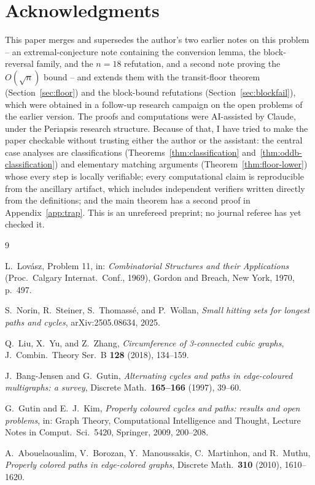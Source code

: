 \documentclass[11pt]{article}
\theoremstyle{definition}
\begin{document}
\section*{Acknowledgments}

This paper merges and supersedes the author's two earlier notes on this problem -- an
extremal-conjecture note containing the conversion lemma, the block-reversal family, and
the $n=18$ refutation, and a second note proving the $O(\sqrt n)$ bound -- and extends
them with the transit-floor theorem (Section~\ref{sec:floor}) and the block-bound
refutations (Section~\ref{sec:blockfail}), which were obtained in a follow-up research
campaign on the open problems of the earlier version. The proofs and computations were
AI-assisted by Claude, under the Periapsis research structure. Because of that, I have
tried to make the paper checkable without trusting either the author or the assistant:
the central case analyses are classifications
(Theorems~\ref{thm:classification} and~\ref{thm:oddb-classification}) and elementary
matching arguments (Theorem~\ref{thm:floor-lower}) whose every step is locally
verifiable; every computational claim is reproducible from the ancillary artifact,
which includes independent verifiers written directly from the definitions; and the
main theorem has a second proof in Appendix~\ref{app:trap}. This is an unrefereed
preprint; no journal referee has yet checked it.

\begin{thebibliography}{9}

L.~Lov\'asz,
Problem 11, in:
\emph{Combinatorial Structures and their Applications}
(Proc.\ Calgary Internat.\ Conf., 1969),
Gordon and Breach, New York, 1970, p.~497.

S.~Norin, R.~Steiner, S.~Thomass\'e, and P.~Wollan,
\emph{Small hitting sets for longest paths and cycles},
arXiv:2505.08634, 2025.

Q.~Liu, X.~Yu, and Z.~Zhang,
\emph{Circumference of 3-connected cubic graphs},
J.~Combin.\ Theory Ser.~B \textbf{128} (2018), 134--159.

J.~Bang-Jensen and G.~Gutin,
\emph{Alternating cycles and paths in edge-coloured multigraphs: a survey},
Discrete Math.\ \textbf{165--166} (1997), 39--60.

G.~Gutin and E.~J.~Kim,
\emph{Properly coloured cycles and paths: results and open problems},
in: Graph Theory, Computational Intelligence and Thought,
Lecture Notes in Comput.\ Sci.\ 5420, Springer, 2009, 200--208.

A.~Abouelaoualim, V.~Borozan, Y.~Manoussakis, C.~Martinhon, and R.~Muthu,
\emph{Properly colored paths in edge-colored graphs},
Discrete Math.\ \textbf{310} (2010), 1610--1620.

\end{thebibliography}
\end{document}
